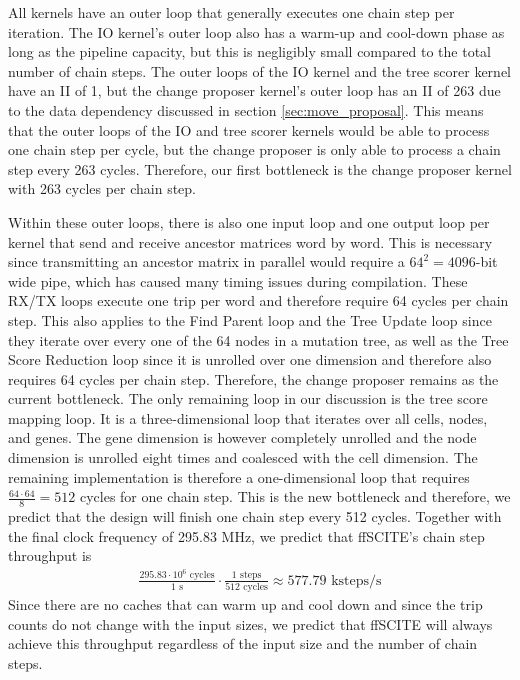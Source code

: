 All kernels have an outer loop that generally executes one chain step per iteration. The IO kernel's outer loop also has a warm-up and cool-down phase as long as the pipeline capacity, but this is negligibly small compared to the total number of chain steps. The outer loops of the IO kernel and the tree scorer kernel have an \ac{II} of 1, but the change proposer kernel's outer loop has an \ac{II} of 263 due to the data dependency discussed in section \ref{sec:move_proposal}. This means that the outer loops of the IO and tree scorer kernels would be able to process one chain step per cycle, but the change proposer is only able to process a chain step every 263 cycles. Therefore, our first bottleneck is the change proposer kernel with 263 cycles per chain step.

Within these outer loops, there is also one input loop and one output loop per kernel that send and receive ancestor matrices word by word. This is necessary since transmitting an ancestor matrix in parallel would require a $64^2 = 4096$-bit wide pipe, which has caused many timing issues during compilation. These RX/TX loops execute one trip per word and therefore require 64 cycles per chain step. This also applies to the Find Parent loop and the Tree Update loop since they iterate over every one of the 64 nodes in a mutation tree, as well as the Tree Score Reduction loop since it is unrolled over one dimension and therefore also requires 64 cycles per chain step. Therefore, the change proposer remains as the current bottleneck. The only remaining loop in our discussion is the tree score mapping loop. It is a three-dimensional loop that iterates over all cells, nodes, and genes. The gene dimension is however completely unrolled and the node dimension is unrolled eight times and coalesced with the cell dimension. The remaining implementation is therefore a one-dimensional loop that requires $\frac{64 \cdot 64}{8} = 512$ cycles for one chain step. This is the new bottleneck and therefore, we predict that the design will finish one chain step every 512 cycles. Together with the final clock frequency of 295.83 MHz, we predict that \ac{ffSCITE}'s chain step throughput is
\begin{align*}
    \frac{295.83 \cdot 10^6 \text{ cycles}}{1 \text{ s}} \cdot \frac{1 \text{ steps}}{512 \text{ cycles}} \approx 577.79 \text{ ksteps/s} 
\end{align*}
Since there are no caches that can warm up and cool down and since the trip counts do not change with the input sizes, we predict that \ac{ffSCITE} will always achieve this throughput regardless of the input size and the number of chain steps.
